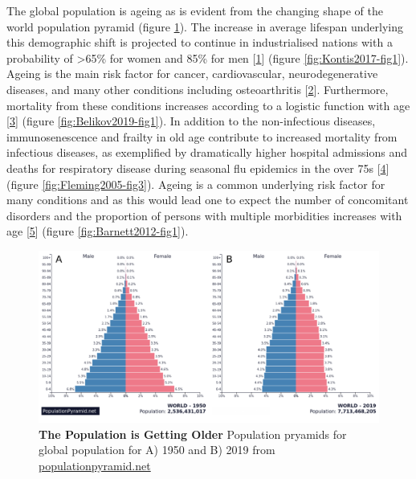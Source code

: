 \documentclass[
]{book}
\begin{document}
The global population is ageing as is evident from the changing shape of the world population pyramid (figure \ref{fig:poppyramid}).
The increase in average lifespan underlying this demographic shift is projected to continue in industrialised nations with a probability of \textgreater65\% for women and 85\% for men {[}\protect\hyperlink{ref-Kontis2017}{1}{]} (figure \ref{fig:Kontis2017-fig1}).
Ageing is the main risk factor for cancer, cardiovascular, neurodegenerative diseases, and many other conditions including osteoarthritis {[}\protect\hyperlink{ref-Niccoli2012}{2}{]}. Furthermore, mortality from these conditions increases according to a logistic function with age {[}\protect\hyperlink{ref-Belikov2019}{3}{]} (figure \ref{fig:Belikov2019-fig1}).
In addition to the non-infectious diseases, immunosenescence and frailty in old age contribute to increased mortality from infectious diseases, as exemplified by dramatically higher hospital admissions and deaths for respiratory disease during seasonal flu epidemics in the over 75s {[}\protect\hyperlink{ref-Fleming2005}{4}{]} (figure \ref{fig:Fleming2005-fig3}).
Ageing is a common underlying risk factor for many conditions and as this would lead one to expect the number of concomitant disorders and the proportion of persons with multiple morbidities increases with age {[}\protect\hyperlink{ref-Barnett2012}{5}{]} (figure \ref{fig:Barnett2012-fig1}).

\begin{figure}

{\centering \includegraphics[width=0.95\linewidth]{figs/population-pryamids-1950-2019} 

}

\caption{\textbf{The Population is Getting Older} Population pryamids for global population for A) 1950 and B) 2019 from \url{populationpyramid.net}}\label{fig:poppyramid}
\end{figure}
\end{document}
